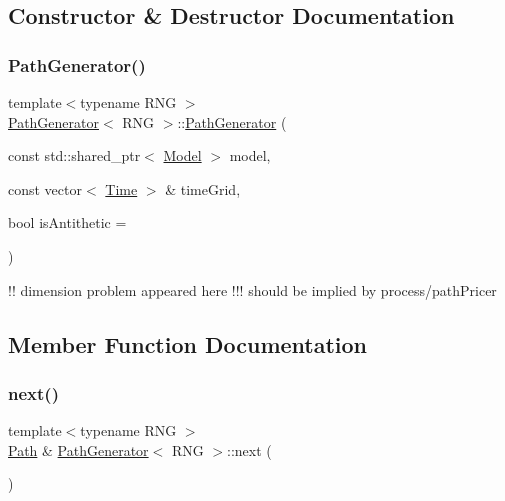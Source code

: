 \subsection{Constructor \& Destructor Documentation}
\hypertarget{class_path_generator_aca7349e0f3e916f634b1a162756b5e1a}{}\label{class_path_generator_aca7349e0f3e916f634b1a162756b5e1a} 
\subsubsection{\texorpdfstring{Path\+Generator()}{PathGenerator()}}
{\footnotesize\ttfamily template$<$typename R\+NG $>$ \\
\hyperlink{class_path_generator}{Path\+Generator}$<$ R\+NG $>$\+::\hyperlink{class_path_generator}{Path\+Generator} (\begin{DoxyParamCaption}\item[{const std\+::shared\+\_\+ptr$<$ \hyperlink{class_model}{Model} $>$}]{model,  }\item[{const vector$<$ \hyperlink{_name_def_8h_ac2d3e0ba793497bcca555c7c2cf64ff3}{Time} $>$ \&}]{time\+Grid,  }\item[{bool}]{is\+Antithetic = {} }\end{DoxyParamCaption})}

!! dimension problem appeared here !!! should be implied by process/path\+Pricer 

\subsection{Member Function Documentation}
\hypertarget{class_path_generator_a848a4f432d86df5b03d835d99472ab37}{}\label{class_path_generator_a848a4f432d86df5b03d835d99472ab37} 
\subsubsection{\texorpdfstring{next()}{next()}}
{\footnotesize\ttfamily template$<$typename R\+NG $>$ \\
\hyperlink{class_path}{Path} \& \hyperlink{class_path_generator}{Path\+Generator}$<$ R\+NG $>$\+::next (\begin{DoxyParamCaption}{ }\end{DoxyParamCaption})}



